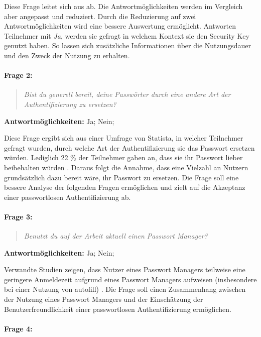Diese Frage leitet sich aus \cite{farke2020you} ab. Die Antwortmöglichkeiten werden im Vergleich aber angepasst und reduziert. Durch die Reduzierung auf zwei Antwortmöglichkeiten wird eine bessere Auswertung ermöglicht. Antworten Teilnehmer mit \textit{Ja}, werden sie gefragt in welchem Kontext sie den Security Key genutzt haben. So lassen sich zusätzliche Informationen über die Nutzungsdauer und den Zweck der Nutzung zu erhalten.

\paragraph{Frage 2:}

\begin{quote}
    \textit{Bist du generell bereit, deine Passwörter durch eine andere Art der Authentifizierung zu ersetzen?}
\end{quote}
\textbf{Antwortmöglichkeiten:} Ja; Nein; 

Diese Frage ergibt sich aus einer Umfrage von Statista, in welcher Teilnehmer gefragt wurden, durch welche Art der Authentifizierung sie das Passwort ersetzen würden. Lediglich 22 \% der Teilnehmer gaben an, dass sie ihr Passwort lieber beibehalten würden \cite{techstat}. Daraus folgt die Annahme, dass eine Vielzahl an Nutzern grundsätzlich dazu bereit wäre, ihr Passwort zu ersetzen. Die Frage soll eine bessere Analyse der folgenden Fragen ermöglichen und zielt auf die Akzeptanz einer passwortlosen Authentifizierung ab.

\paragraph{Frage 3:}

\begin{quote}
    \textit{Benutzt du auf der Arbeit aktuell einen Passwort Manager?}
\end{quote}

\textbf{Antwortmöglichkeiten:} Ja; Nein;

Verwandte Studien zeigen, dass Nutzer eines Passwort Managers teilweise eine geringere Anmeldezeit aufgrund eines Passwort Managers aufweisen (insbesondere bei einer Nutzung von autofill) \cite{farke2020you}. Die Frage soll einen Zusammenhang zwischen der Nutzung eines Passwort Managers und der Einschätzung der Benutzerfreundlichkeit einer passwortlosen Authentifizierung ermöglichen.

\paragraph{Frage 4:}

